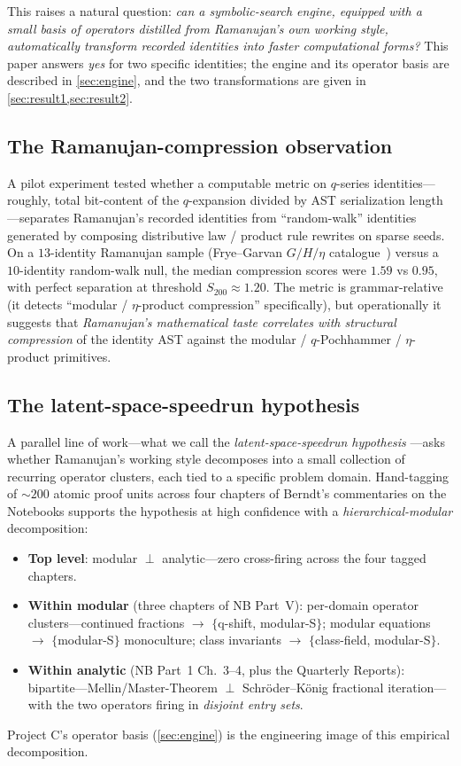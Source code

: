 \documentclass[11pt,reqno]{amsart}
\theoremstyle{definition}
\begin{document}
This raises a natural question: \emph{can a symbolic-search engine,
equipped with a small basis of operators distilled from Ramanujan's
own working style, automatically transform recorded identities into
faster computational forms?} This paper answers \emph{yes} for two
specific identities; the engine and its operator basis are described
in \cref{sec:engine}, and the two transformations are given in
\cref{sec:result1,sec:result2}.

\subsection{The Ramanujan-compression observation}

A pilot experiment \cite[diary~39]{ProjectC} tested whether a
computable metric on $q$-series identities---roughly, total
bit-content of the $q$-expansion divided by AST serialization
length---separates Ramanujan's recorded identities from
``random-walk'' identities generated by composing distributive law /
product rule rewrites on sparse seeds. On a $13$-identity Ramanujan
sample (Frye--Garvan $G/H/\eta$ catalogue~\cite{GarvanFrye}) versus a
$10$-identity random-walk null, the median compression scores were
$1.59$ vs $0.95$, with perfect separation at threshold
$S_{200} \approx 1.20$. The metric is grammar-relative (it detects
``modular / $\eta$-product compression'' specifically), but
operationally it suggests that \emph{Ramanujan's mathematical taste
correlates with structural compression} of the identity AST against
the modular / $q$-Pochhammer / $\eta$-product primitives.

\subsection{The latent-space-speedrun hypothesis}

A parallel line of work---what we call the
\emph{latent-space-speedrun hypothesis}
\cite[\S D1]{ProjectC}---asks whether Ramanujan's working style
decomposes into a small collection of recurring operator clusters,
each tied to a specific problem domain. Hand-tagging of $\sim 200$
atomic proof units across four chapters of Berndt's commentaries on
the Notebooks supports the hypothesis at high confidence with a
\emph{hierarchical-modular} decomposition:
\begin{itemize}
\item \textbf{Top level}: modular $\perp$ analytic---zero
  cross-firing across the four tagged chapters.
\item \textbf{Within modular} (three chapters of NB Part~V): per-domain
  operator clusters---continued fractions $\to$
  $\{$q-shift, modular-S$\}$; modular equations $\to$
  $\{$modular-S$\}$ monoculture; class invariants $\to$
  $\{$class-field, modular-S$\}$.
\item \textbf{Within analytic} (NB Part~1 Ch.~3--4, plus the Quarterly
  Reports): bipartite---Mellin/Master-Theorem $\perp$
  Schr\"oder--K\"onig fractional iteration---with the two operators
  firing in \emph{disjoint entry sets}.
\end{itemize}
Project C's operator basis (\cref{sec:engine}) is the engineering
image of this empirical decomposition.
\end{document}
